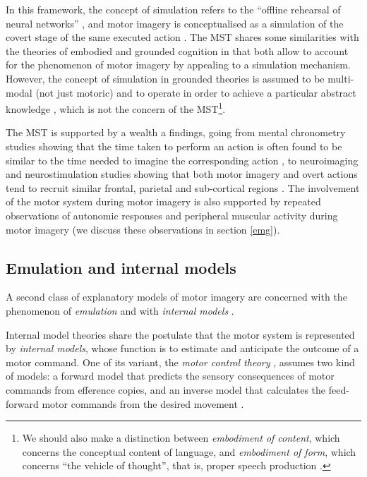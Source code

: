 \documentclass[a4paper,12pt,oneside,oldfontcommands]{memoir}
\let\rmarkdownfootnote\footnote%
\def\footnote{\protect\rmarkdownfootnote}
\begin{document}
In this framework, the concept of simulation refers to the ``offline
rehearsal of neural networks'' \citep{jeannerod_motor_2006}, and motor
imagery is conceptualised as a simulation of the covert stage of the
same executed action \citep{oshea_does_2017}. The MST shares some
similarities with the theories of embodied and grounded cognition
\citep{barsalou_grounded_2008} in that both allow to account for the
phenomenon of motor imagery by appealing to a simulation mechanism.
However, the concept of simulation in grounded theories is assumed to be
multi-modal (not just motoric) and to operate in order to achieve a
particular abstract knowledge \citep{oshea_does_2017}, which is not the
concern of the MST\footnote{We should also make a distinction between
  \emph{embodiment of content}, which concerns the conceptual content of
  language, and \emph{embodiment of form}, which concerns ``the vehicle
  of thought'', that is, proper speech production
  \citep{pickering_integrated_2013}.}.

The MST is supported by a wealth a findings, going from mental
chronometry studies showing that the time taken to perform an action is
often found to be similar to the time needed to imagine the
corresponding action \citep[though not always, see][for a review of
controversial findings and for an alternative conceptualisation of motor
imagery]{glover_motor-cognitive_2017}, to neuroimaging and
neurostimulation studies showing that both motor imagery and overt
actions tend to recruit similar frontal, parietal and sub-cortical
regions \citep[e.g.,][]{hetu_neural_2013, jeannerod_neural_2001}. The
involvement of the motor system during motor imagery is also supported
by repeated observations of autonomic responses and peripheral muscular
activity during motor imagery (we discuss these observations in section
\ref{emg}).

\subsection{Emulation and internal
models}\label{emulation-and-internal-models}

A second class of explanatory models of motor imagery are concerned with
the phenomenon of \emph{emulation} and with \emph{internal models}
\citep[see][for a review of the similarities and dissimilarities of
simulation and emulation models]{gentsch_towards_2016}.

Internal model theories share the postulate that the motor system is
represented by \emph{internal models}, whose function is to estimate and
anticipate the outcome of a motor command. One of its variant, the
\emph{motor control theory}
\citep[e.g.,][]{kawato_internal_1999, wolpert_internal_1995}, assumes
two kind of models: a forward model that predicts the sensory
consequences of motor commands from efference copies, and an inverse
model that calculates the feed-forward motor commands from the desired
movement \citep{gentsch_towards_2016}.
\end{document}
